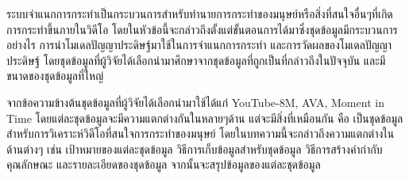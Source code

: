 ระบบจำแนกการกระทำเป็นกระบวนการสำหรับทำนายการกระทำของมนุษย์หรือสิ่งที่สนใจอื่นๆที่เกิดการกระทำขึ้นภายในวิดีโอ 
โดยในหัวข้อนี้จะกล่าวถึงตั้งแต่ขั้นตอนการได้มาซึ่งชุดข้อมูลมีกระบวนการอย่างไร การนำโมเดลปัญญาประดิษฐ์มาใช้ในการจำแนกการกระทำ และการวัดผลของโมเดลปัญญาประดิษฐ์
โดยชุดข้อมูลที่ผู้วิจัยได้เลือกนำมาศึกษาจากชุดข้อมูลที่ถูกเป็นที่กล่าวถึงในปัจจุบัน และมีขนาดของชุดข้อมูลที่ใหญ่

จากข้อความข้างต้นชุดข้อมูลที่ผู้วิจัยได้เลือกนำมาใช้ได้แก่ YouTube-8M, AVA, Moment in Time โดยแต่ละชุดข้อมูลจะมีความแตกต่างกันในหลายๆด้าน 
แต่จะมีสิ่งที่เหมือนกัน คือ เป็นชุดข้อมูลสำหรับการวิเคราะห์วิดีโอที่สนใจการกระทำของมนุษย์ โดยในบทความนี้จะกล่าวถึงความแตกต่างในด้านต่างๆ 
เช่น เป้าหมายของแต่ละชุดข้อมูล วิธีการเก็บข้อมูลสำหรับชุดข้อมูล วิธีการสร้างคำกำกับคุณลักษณะ และรายละเอียดของชุดข้อมูล จากนั้นจะสรุปข้อมูลของแต่ละชุดข้อมูล

